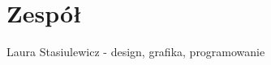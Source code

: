 \documentclass[a4paper]{scrreprt}
\begin{document}







\chapter{Zespół}
Laura Stasiulewicz - design, grafika, programowanie



%
%
\end{document}
